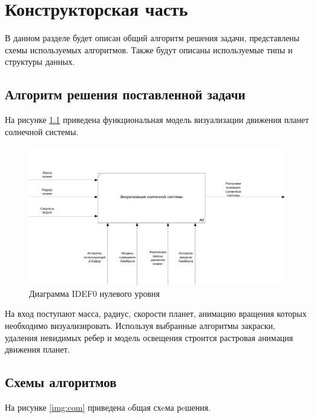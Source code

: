 \chapter{Конструкторская часть}

В данном разделе будет описан общий алгоритм решения задачи, представлены схемы используемых алгоритмов. Также будут описаны используемые типы и структуры данных.


\section{Алгоритм решения поставленной задачи}
На рисунке \ref{img:idef0} приведена функциональная модель визуализации движения планет солнечной системы.

\begin{figure}[H]
	\begin{center}
		\includegraphics[scale=0.6]{img/idef0.png}
	\end{center}
	\captionsetup{justification=centering}
	\caption{Диаграмма IDEF0 нулевого уровня}
	\label{img:idef0}
\end{figure}

На вход поступают масса, радиус, скорости планет, анимацию вращения которых необходимо визуализировать. 
Используя выбранные алгоритмы закраски, удаления невидимых ребер и
модель освещения строится растровая анимация движения планет.

\section{Схемы алгоритмов}

На рисунке \ref{img:com} приведена oбщая схeма рeшения.

